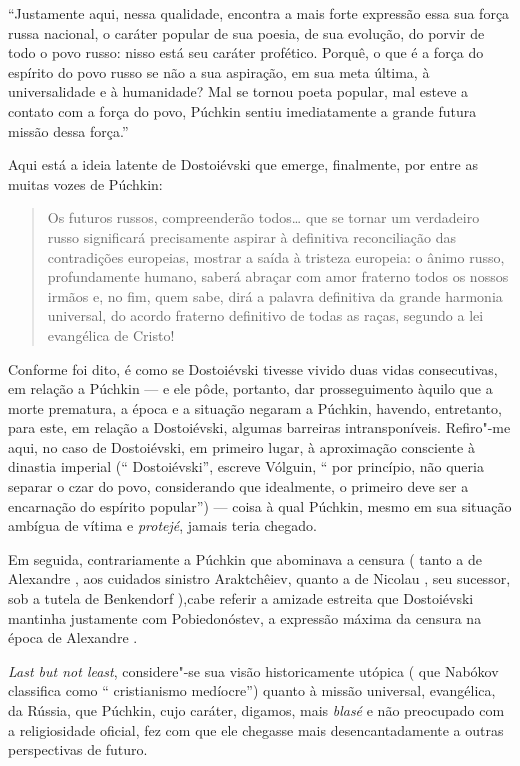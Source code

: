 ``Justamente aqui, nessa qualidade, encontra a mais forte expressão essa
sua força russa nacional, o caráter popular de sua poesia, de sua
evolução, do porvir de todo o povo russo: nisso está seu caráter
profético. Porquê, o que é a força do espírito do povo russo se não a
sua aspiração, em sua meta última, à universalidade e à humanidade? Mal
se tornou poeta popular, mal esteve a contato com a força do povo,
Púchkin sentiu imediatamente a grande futura missão dessa força.''

Aqui está a ideia latente de Dostoiévski que emerge, finalmente, por
entre as muitas vozes de Púchkin:

\begin{quote}
Os futuros russos, compreenderão todos\ldots{} que se tornar um verdadeiro
russo significará precisamente aspirar à definitiva reconciliação das
contradições europeias, mostrar a saída à tristeza europeia: o ânimo
russo, profundamente humano, saberá abraçar com amor fraterno todos os
nossos irmãos e, no fim, quem sabe, dirá a palavra definitiva da grande
harmonia universal, do acordo fraterno definitivo de todas as raças,
segundo a lei evangélica de Cristo!
\end{quote}

Conforme foi dito, é como se Dostoiévski tivesse vivido duas vidas
consecutivas, em relação a Púchkin --- e ele pôde, portanto, dar
prosseguimento àquilo que a morte prematura, a época e a situação
negaram a Púchkin, havendo, entretanto, para este, em relação a
Dostoiévski, algumas barreiras intransponíveis. Refiro"-me aqui, no caso
de Dostoiévski, em primeiro lugar, à aproximação consciente à dinastia
imperial (`` Dostoiévski'', escreve Vólguin, `` por princípio, não
queria separar o czar do povo, considerando que idealmente, o primeiro
deve ser a encarnação do espírito popular'') --- coisa à qual Púchkin,
mesmo em sua situação ambígua de vítima e \emph{protejé}, jamais teria
chegado.

Em seguida, contrariamente a Púchkin que abominava a censura ( tanto a
de Alexandre , aos cuidados sinistro Araktchêiev, quanto a de Nicolau 
, seu sucessor, sob a tutela de Benkendorf ),cabe referir a amizade
estreita que Dostoiévski mantinha justamente com Pobiedonóstev, a
expressão máxima da censura na época de Alexandre .

\emph{Last but not least}, considere"-se sua visão historicamente utópica
( que Nabókov classifica como `` cristianismo medíocre'') quanto à
missão universal, evangélica, da Rússia, que Púchkin, cujo caráter, digamos, mais \emph{blasé} e não preocupado com a religiosidade
oficial, fez com que ele chegasse mais desencantadamente a outras
perspectivas de futuro.

